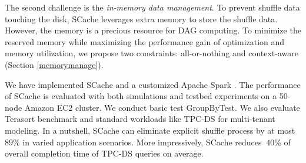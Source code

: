 The second challenge is the \textit{in-memory data management}. To prevent shuffle data touching the disk, SCache leverages extra memory to store the shuffle data. However, the memory is a precious resource for DAG computing. To minimize the reserved memory while maximizing the performance gain of optimization and memory utilization, we propose two constraints: all-or-nothing and context-aware (Section \ref{memorymanage}).

We have implemented SCache and a customized Apache Spark \cite{apachespark}. The performance of SCache is evaluated with both simulations and testbed experiments on a 50-node Amazon EC2 cluster. We conduct basic test GroupByTest. We also evaluate Terasort \cite{spark-tera} benchmark and standard workloads like TPC-DS \cite{tpcds} for multi-tenant modeling. In a nutshell, SCache can eliminate explicit shuffle process by at most $89\%$ in varied application scenarios. More impressively, SCache reduces $~40\%$ of overall completion time of TPC-DS queries on average.

